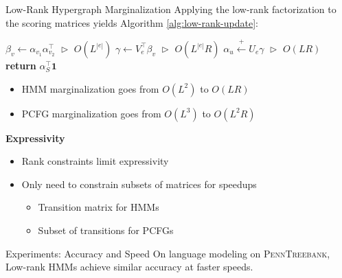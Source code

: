 \documentclass{beamer}
\newlength{\onecolwid}
\begin{document}
\begin{frame}
\begin{columns}[t]
\begin{column}{\onecolwid}
\begin{block}{Low-Rank Hypergraph Marginalization}
Applying the low-rank factorization to the scoring matrices yields
Algorithm \ref{alg:low-rank-update}:
\begin{center}
\begin{algorithm}[H]
\caption{\label{alg:low-rank-update} Low-rank marginalization}
\begin{algorithmic} 
\STATE $\beta_v \gets \alpha_{v_1}\alpha_{v_2}^\top$
    \hfill $\vartriangleright$ $O(L^{|e|})$
\STATE $\gamma \gets V_e^\top\beta_v$
    \hfill $\vartriangleright$ $O(L^{|e|}R)$
\STATE $\alpha_u \stackrel{+}{\gets} U_e\gamma $
    \hfill $\vartriangleright$ $O(LR)$
\ENDFOR
\STATE \textbf{return} $\alpha_S^\top\mathbf{1}$
\end{algorithmic} 
\end{algorithm}
\end{center}

\begin{itemize}
\item HMM marginalization goes from $O(L^2)$ to $O(LR)$
\item PCFG marginalization goes from $O(L^3)$ to $O(L^2R)$
\end{itemize}

\textbf{Expressivity}
\begin{itemize}
\item Rank constraints limit expressivity
\item Only need to constrain subsets of matrices for speedups
    \begin{itemize}
    \item Transition matrix for HMMs
    \item Subset of transitions for PCFGs
    \end{itemize}
\end{itemize}

\end{block}


\begin{block}{Experiments: Accuracy and Speed}
On language modeling on \textsc{PennTreebank},
Low-rank HMMs achieve similar accuracy at faster speeds. 


\end{block}
\end{column}
\end{columns}
\end{frame}
\end{document}
